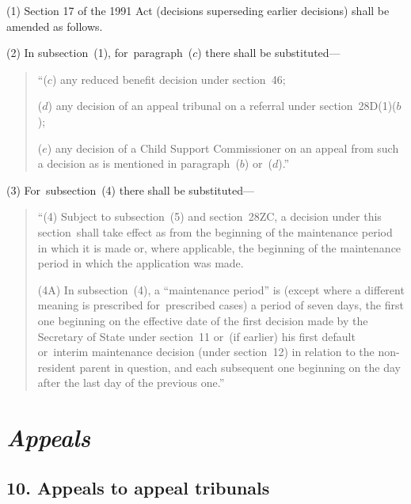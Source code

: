 \documentclass[12pt,a4paper]{article}
\begin{document}
(1) Section 17 of the 1991 Act (decisions superseding earlier decisions) shall be amended as follows.

(2) In subsection~(1), for~paragraph~($c$)  there shall be substituted—
\begin{quotation}
“($c$) any reduced benefit decision under section~46;

($d$) any decision of an appeal tribunal on a referral under section~28D(1)($b$);

($e$) any decision of a Child Support Commissioner on an appeal from such a decision as is mentioned in paragraph~($b$)  or~($d$).”
\end{quotation}

(3) For~subsection~(4)  there shall be substituted—
\begin{quotation}
“(4) Subject to subsection~(5)  and section~28ZC, a decision under this section~shall take effect as from the beginning of the maintenance period in which it is made or, where applicable, the beginning of the maintenance period in which the application was made.

(4A) In subsection~(4), a “maintenance period” is (except where a different meaning is prescribed for~prescribed cases) a period of seven days, the first one beginning on the effective date of the first decision made by the Secretary of State under section~11 or~(if earlier) his first default or~interim maintenance decision (under section~12) in relation to the non-resident parent in question, and each subsequent one beginning on the day after the last day of the previous one.”
\end{quotation}


\section{\itshape Appeals}

\subsection{10. Appeals to appeal tribunals}
\end{document}
